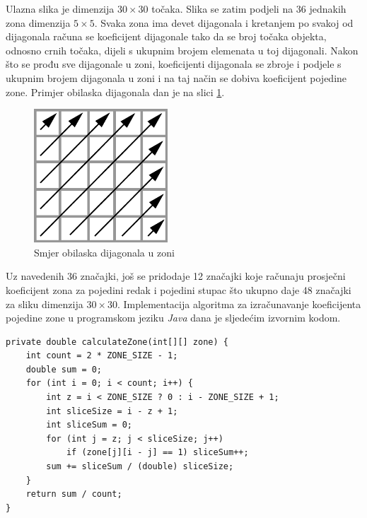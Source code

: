 Ulazna slika je dimenzija $30 \times 30$ točaka. Slika se zatim podjeli na 36 jednakih zona dimenzija $5 \times 5$. Svaka zona ima devet dijagonala i kretanjem po svakoj od dijagonala računa se koeficijent dijagonale tako da se broj točaka objekta, odnosno crnih točaka, dijeli s ukupnim brojem elemenata u toj dijagonali. Nakon što se prođu sve dijagonale u zoni, koeficijenti dijagonala se zbroje i podjele s ukupnim brojem dijagonala u zoni i na taj način se dobiva koeficijent pojedine zone. Primjer obilaska dijagonala dan je na slici \ref{fig:diagonals}.
\begin{figure}[htb]
    \centering
    \includegraphics[width=5cm]{images/diagonal_arrows.pdf}
    \caption{Smjer obilaska dijagonala u zoni}
    \label{fig:diagonals}
\end{figure}

Uz navedenih 36 značajki, još se pridodaje 12 značajki koje računaju prosječni koeficijent zona za pojedini redak i pojedini stupac što ukupno daje 48 značajki za sliku dimenzija $30 \times 30$. Implementacija algoritma za izračunavanje koeficijenta pojedine zone u programskom jeziku \emph{Java} dana je sljedećim izvornim kodom.
\lstset{language=Java, tabsize=2}
\begin{lstlisting}
private double calculateZone(int[][] zone) {
    int count = 2 * ZONE_SIZE - 1;
    double sum = 0;
    for (int i = 0; i < count; i++) {
        int z = i < ZONE_SIZE ? 0 : i - ZONE_SIZE + 1;
        int sliceSize = i - z + 1;
        int sliceSum = 0;
        for (int j = z; j < sliceSize; j++)
            if (zone[j][i - j] == 1) sliceSum++;
        sum += sliceSum / (double) sliceSize;
    }
    return sum / count;
}
\end{lstlisting}
